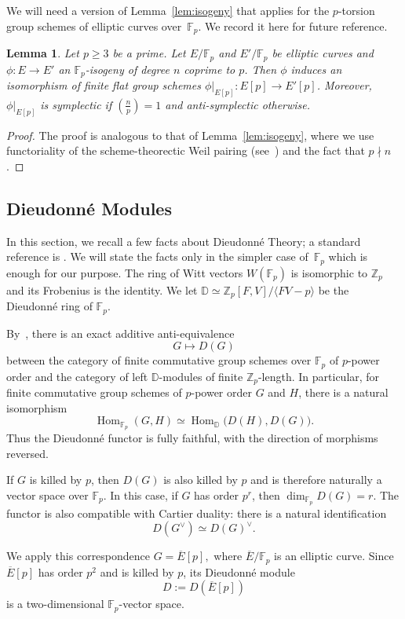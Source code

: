 \documentclass[12pt]{amsart}
\numberwithin{equation}{section}
\newtheorem{lemma}[equation]{Lemma}
\theoremstyle{definition}
\newcommand{\F}{\mathbb{F}}
\newcommand{\Z}{\mathbb{Z}}
\DeclareMathOperator{\Hom}{Hom}
\begin{document}
We will need a version of Lemma~\ref{lem:isogeny} that applies for the $p$-torsion group schemes of elliptic curves over~$\F_p$. We record it here for future reference.

\begin{lemma}\label{lem:isogenySchemes} 
Let $p \geq 3$ be a prime. Let $E/\F_p$ and $E'/\F_p$ be elliptic curves and $\phi:E\to E'$ an $\F_p$-isogeny of degree $n$ coprime to $p$. Then $\phi$ induces an
isomorphism of finite flat group schemes
$\phi|_{E[p]}:E[p]\to E'[p]$. Moreover, $\phi|_{E[p]}$
is symplectic 
if $\left(\frac{n}{p}\right)=1$
and anti-symplectic otherwise.
\end{lemma}
\begin{proof} The proof is analogous to that of Lemma~\ref{lem:isogeny}, where we use functoriality of the 
scheme-theorectic Weil pairing (see~\cite[\S2.8]{KatzMazur}) and the fact that $p \nmid n$. 
\end{proof}

\subsection{Dieudonn\'e Modules}\label{sec:Dieudonne}
In this section, we recall a few facts about Dieudonn\'e Theory; a standard reference is \cite[\S 1.4]{CCO}. We will state the facts only in the simpler case of~$\F_p$ which is enough for our purpose.
The ring of Witt vectors $W(\F_p)$ is isomorphic to $\Z_p$ and its Frobenius is the identity. We let $\mathbb{D} \simeq \Z_p[F,V]/\langle FV-p \rangle$ be the Dieudonn\'e ring of $\F_p$.

By~\cite[Theorem~1.4.3.2]{CCO}, there is an exact additive anti-equivalence
\[
 G\longmapsto D(G)
\]
between the category of finite commutative group schemes over $\F_p$ of
$p$-power order and the category of left $\mathbb D$-modules of
finite $\Z_p$-length. In particular, for finite commutative group
schemes of $p$-power order $G$ and $H$, there is a natural isomorphism
\[
 \Hom_{\F_p}(G,H)
 \simeq
 \Hom_{\mathbb D}\bigl(D(H),D(G)\bigr).
\]
Thus the Dieudonn\'e functor is fully faithful, with the direction of
morphisms reversed.

If $G$ is killed by $p$, then $D(G)$ is also killed by $p$ and is
therefore naturally a vector space over $\F_p$.
In this case, if $G$ has order $p^r$, then
\(
 \dim_{\F_p} D(G)=r.
\)
The functor is also compatible with Cartier duality: there is a
natural identification
\[
 D(G^\vee)\simeq D(G)^\vee.
\]

We apply this correspondence 
\(
 G=\overline E[p],
\)
where $\overline E/\F_p$ is an elliptic curve. Since
$\overline E[p]$ has order $p^2$ and is killed by $p$, its
Dieudonn\'e module
\[
 D:=D(\overline E[p])
\]
is a two-dimensional $\F_p$-vector space. 
\end{document}
